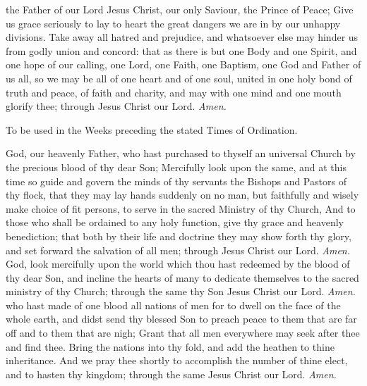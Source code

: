  the Father of our Lord Jesus Christ, our only Saviour, the Prince of Peace; Give us grace seriously to lay to heart the great dangers we are in by our unhappy divisions. Take away all hatred and prejudice, and whatsoever else may hinder us from godly union and concord: that as there is but one Body and one Spirit, and one hope of our calling, one Lord, one Faith, one Baptism, one God and Father of us all, so we may be all of one heart and of one soul, united in one holy bond of truth and peace, of faith and charity, and may with one mind and one mouth glorify thee; through Jesus Christ our Lord. \textit{Amen.}
\begin{rubric}
To be used in the Weeks preceding the stated Times of Ordination.
\end{rubric}
 God, our heavenly Father, who hast purchased to thyself an universal Church by the precious blood of thy dear Son; Mercifully look upon the same, and at this time so guide and govern the minds of thy servants the Bishops and Pastors of thy flock, that they may lay hands suddenly on no man, but faithfully and wisely make choice of fit persons, to serve in the sacred Ministry of thy Church, And to those who shall be ordained to any holy function, give thy grace and heavenly benediction; that both by their life and doctrine they may show forth thy glory, and set forward the salvation of all men; through Jesus Christ our Lord. \textit{Amen.}
 God, look mercifully upon the world which thou hast redeemed by the blood of thy dear Son, and incline the hearts of many to dedicate themselves to the sacred ministry of thy Church; through the same thy Son Jesus Christ our Lord. \textit{Amen.}
 who hast made of one blood all nations of men for to dwell on the face of the whole earth, and didst send thy blessed Son to preach peace to them that are far off and to them that are nigh; Grant that all men everywhere may seek after thee and find thee. Bring the nations into thy fold, and add the heathen to thine inheritance. And we pray thee shortly to accomplish the number of thine elect, and to hasten thy kingdom; through the same Jesus Christ our Lord. \textit{Amen.}

